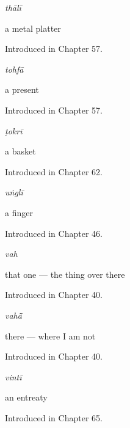 \noindent\begin{minipage}[t]{\linewidth}
\raggedright
\textbf{}\enspace\emph{thālī}\par
\small a metal platter\par
\footnotesize Introduced in Chapter 57.
\end{minipage}\par\medskip

\noindent\begin{minipage}[t]{\linewidth}
\raggedright
\textbf{}\enspace\emph{tohfā}\par
\small a present\par
\footnotesize Introduced in Chapter 57.
\end{minipage}\par\medskip

\noindent\begin{minipage}[t]{\linewidth}
\raggedright
\textbf{}\enspace\emph{ṭokrī}\par
\small a basket\par
\footnotesize Introduced in Chapter 62.
\end{minipage}\par\medskip

\noindent\begin{minipage}[t]{\linewidth}
\raggedright
\textbf{}\enspace\emph{uṅglī}\par
\small a finger\par
\footnotesize Introduced in Chapter 46.
\end{minipage}\par\medskip

\noindent\begin{minipage}[t]{\linewidth}
\raggedright
\textbf{}\enspace\emph{vah}\par
\small that one — the thing over there\par
\footnotesize Introduced in Chapter 40.
\end{minipage}\par\medskip

\noindent\begin{minipage}[t]{\linewidth}
\raggedright
\textbf{}\enspace\emph{vahā̃}\par
\small there — where I am not\par
\footnotesize Introduced in Chapter 40.
\end{minipage}\par\medskip

\noindent\begin{minipage}[t]{\linewidth}
\raggedright
\textbf{}\enspace\emph{vintī}\par
\small an entreaty\par
\footnotesize Introduced in Chapter 65.
\end{minipage}\par\medskip

